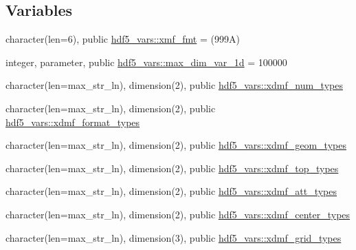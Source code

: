 \subsection*{Variables}
\begin{DoxyCompactItemize}
\item 
character(len=6), public \hyperlink{namespacehdf5__vars_ad8665a0387dde737161d1162565aefa9}{hdf5\+\_\+vars\+::xmf\+\_\+fmt} = \textquotesingle{}(999\+A)\textquotesingle{}
\item 
integer, parameter, public \hyperlink{namespacehdf5__vars_a69c36b36ad7f55ff124ebc328d18adb7}{hdf5\+\_\+vars\+::max\+\_\+dim\+\_\+var\+\_\+1d} = 100000
\item 
character(len=max\+\_\+str\+\_\+ln), dimension(2), public \hyperlink{namespacehdf5__vars_ad8c38b66b3e9b402f05e7e7a36415fb3}{hdf5\+\_\+vars\+::xdmf\+\_\+num\+\_\+types}
\item 
character(len=max\+\_\+str\+\_\+ln), dimension(2), public \hyperlink{namespacehdf5__vars_ab9c0d2270239bf1963c6294ab7198f8c}{hdf5\+\_\+vars\+::xdmf\+\_\+format\+\_\+types}
\item 
character(len=max\+\_\+str\+\_\+ln), dimension(2), public \hyperlink{namespacehdf5__vars_acabe6ee64c1612c30ab37774678238e5}{hdf5\+\_\+vars\+::xdmf\+\_\+geom\+\_\+types}
\item 
character(len=max\+\_\+str\+\_\+ln), dimension(2), public \hyperlink{namespacehdf5__vars_ad25ea0a5a9a4bb3f9248a7fa61ea1363}{hdf5\+\_\+vars\+::xdmf\+\_\+top\+\_\+types}
\item 
character(len=max\+\_\+str\+\_\+ln), dimension(2), public \hyperlink{namespacehdf5__vars_a43c511f4b84cd716387c39c78b2cfe54}{hdf5\+\_\+vars\+::xdmf\+\_\+att\+\_\+types}
\item 
character(len=max\+\_\+str\+\_\+ln), dimension(2), public \hyperlink{namespacehdf5__vars_a7f20d570d2304c8e953646599bf61d73}{hdf5\+\_\+vars\+::xdmf\+\_\+center\+\_\+types}
\item 
character(len=max\+\_\+str\+\_\+ln), dimension(3), public \hyperlink{namespacehdf5__vars_ab7b59b4afbcaff92aa1c236c23a4bf58}{hdf5\+\_\+vars\+::xdmf\+\_\+grid\+\_\+types}
\end{DoxyCompactItemize}
